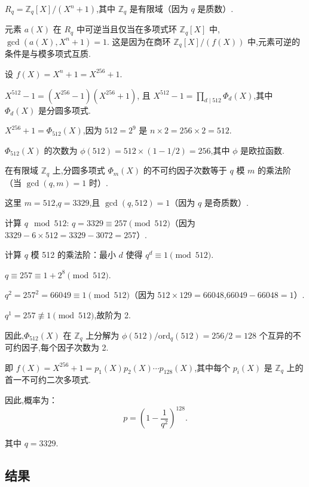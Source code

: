 \documentclass[12pt,a4paper]{article}
\numberwithin{equation}{section}
\begin{document}
$R_q = \mathbb{Z}_q[X]/(X^n + 1)$,其中 $\mathbb{Z}_q$ 是有限域（因为 $q$ 是质数）.

元素 $a(X)$ 在 $R_q$ 中可逆当且仅当在多项式环 $\mathbb{Z}_q[X]$ 中,$\gcd(a(X), X^n + 1) = 1$.
这是因为在商环 $\mathbb{Z}_q[X]/(f(X))$ 中,元素可逆的条件是与模多项式互质.

设 $f(X) = X^n + 1 = X^{256} + 1$.

$X^{512} - 1 = (X^{256} - 1)(X^{256} + 1)$,
且 $X^{512} - 1 = \prod_{d \mid 512} \Phi_d(X)$,其中 $\Phi_d(X)$ 是分圆多项式.

$X^{256} + 1 = \Phi_{512}(X)$,因为 $512 = 2^9$ 是 $n \times 2 = 256 \times 2 = 512$.

$\Phi_{512}(X)$ 的次数为 $\phi(512) = 512 \times (1 - 1/2) = 256$,其中 $\phi$ 是欧拉函数.

在有限域 $\mathbb{Z}_q$ 上,分圆多项式 $\Phi_m(X)$ 的不可约因子次数等于 $q$ 模 $m$ 的乘法阶（当 $\gcd(q, m) = 1$ 时）.

这里 $m = 512$,$q = 3329$,且 $\gcd(q, 512) = 1$（因为 $q$ 是奇质数）.

计算 $q \mod 512$: $q = 3329 \equiv 257 \pmod{512}$（因为 $3329 - 6 \times 512 = 3329 - 3072 = 257$）.

计算 $q$ 模 512 的乘法阶：最小 $d$ 使得 $q^d \equiv 1 \pmod{512}$.

$q \equiv 257 \equiv 1 + 2^8 \pmod{512}$.

$q^2 = 257^2 = 66049 \equiv 1 \pmod{512}$（因为 $512 \times 129 = 66048$,$66049 - 66048 = 1$）.

$q^1 = 257 \not\equiv 1 \pmod{512}$,故阶为 2.

因此,$\Phi_{512}(X)$ 在 $\mathbb{Z}_q$ 上分解为 $\phi(512) / \text{ord}_q(512) = 256 / 2 = 128$ 个互异的不可约因子,每个因子次数为 2.

即 $f(X) = X^{256} + 1 = p_1(X) p_2(X) \cdots p_{128}(X)$,其中每个 $p_i(X)$ 是 $\mathbb{Z}_q$ 上的首一不可约二次多项式.

因此,概率为：
\begin{equation}
	p = \left(1 - \frac{1}{q^2}\right)^{128}.
\end{equation}


其中 $q = 3329$.



\subsection{结果}
\end{document}
